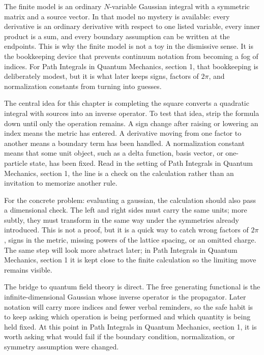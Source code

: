 The finite model is an ordinary \(N\)-variable Gaussian integral with a symmetric matrix and a source vector.  In that model no mystery is available: every derivative is an ordinary derivative with respect to one listed variable, every inner product is a sum, and every boundary assumption can be written at the endpoints.  This is why the finite model is not a toy in the dismissive sense.  It is the bookkeeping device that prevents continuum notation from becoming a fog of indices.  For Path Integrals in Quantum Mechanics, section 1, that bookkeeping is deliberately modest, but it is what later keeps signs, factors of \(2\pi\), and normalization constants from turning into guesses.

The central idea for this chapter is completing the square converts a quadratic integral with sources into an inverse operator.  To test that idea, strip the formula down until only the operation remains.  A sign change after raising or lowering an index means the metric has entered.  A derivative moving from one factor to another means a boundary term has been handled.  A normalization constant means that some unit object, such as a delta function, basis vector, or one-particle state, has been fixed.  Read in the setting of Path Integrals in Quantum Mechanics, section 1, the line is a check on the calculation rather than an invitation to memorize another rule.

For the concrete problem: evaluating a gaussian, the calculation should also pass a dimensional check.  The left and right sides must carry the same units; more subtly, they must transform in the same way under the symmetries already introduced.  This is not a proof, but it is a quick way to catch wrong factors of \(2\pi\), signs in the metric, missing powers of the lattice spacing, or an omitted charge.  The same step will look more abstract later; in Path Integrals in Quantum Mechanics, section 1 it is kept close to the finite calculation so the limiting move remains visible.

The bridge to quantum field theory is direct.  The free generating functional is the infinite-dimensional Gaussian whose inverse operator is the propagator.  Later notation will carry more indices and fewer verbal reminders, so the safe habit is to keep asking which operation is being performed and which quantity is being held fixed.  At this point in Path Integrals in Quantum Mechanics, section 1, it is worth asking what would fail if the boundary condition, normalization, or symmetry assumption were changed.

